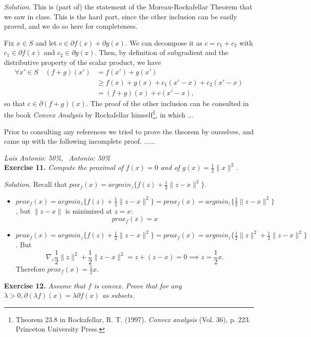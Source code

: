 \documentclass[12pt]{article}
\begin{document}
\emph{Solution}. This is (part of) the statement of the Moreau-Rockafellar Theorem that we saw in class. This is the hard part, since the other inclusion can be easily proved, and we do so here for completeness.\newpage

Fix $x\in S$ and let $c\in \partial f(x) + \partial g(x)$. We can decompose it as $c=c_1+c_2$ with $c_1\in\partial f(x)$ and $c_2\in \partial g(x)$. Then, by definition of subgradient and the distributive property of the scalar product, we have
\begin{align*}
\forall x' \in S \quad (f+g)(x') &= f(x') + g(x')\\
&\geq f(x) + g(x) + c_1(x'-x) + c_2(x'-x)\\
&= (f+g)(x) + c(x'-x),
\end{align*}
so that $c\in \partial(f+g)(x)$. The proof of the other inclusion can be consulted in the book \textit{Convex Analysis} by Rockafellar himself\footnote{Theorem 23.8 in Rockafellar, R. T. (1997). \textit{Convex analysis} (Vol. 36), p. 223. Princeton University Press.}, in which ...

Prior to consulting any references we tried to prove the theorem by ourselves, and came up with the following incomplete proof. ......

\textit{Luis Antonio: 50\%}, \ \textit{Antonio: 50\%}\\
\textbf{Exercise 11. }\emph{Compute the proximal of \( f(x) = 0 \) and of \( g(x) = \frac{1}{2}\|x\|^2 \).}

\emph{Solution. }Recall that \( pox_f(x) = argmin_z\{f(z) + \frac{1}{2} \|z - x\|^2 \} \).
\begin{itemize}
    \item \( prox_f(x) = argmin_z\{f(z) + \frac{1}{2} \|z - x\|^2 \}  =  prox_f(x) = argmin_z\{ \frac{1}{2} \|z - x\|^2 \} \), but \( \|z-x\| \) is minimized at \( z = x \):
    \[
         prox_f(x) = x
    \]
    \item  \( prox_f(x) = argmin_z\{f(z) + \frac{1}{2} \|z - x\|^2 \}  =  prox_f(x) = argmin_z\{\frac{1}{2}\|z\|^2 + \frac{1}{2} \|z - x\|^2 \} \). But
    \[
         \nabla_z \frac{1}{2} \|z\|^2 + \frac{1}{2}\|z-x\|^2 = z + (z - x) = 0 \implies z = \frac{1}{2}x.
    \]
    Therefore \( prox_f(x) = \frac{1}{2}x \).
\end{itemize}

\textbf{Exercise 12. }\emph{Assume that \( f \)  is convex. Prove that for any \( \lambda > 0, \partial(\lambda f)(x) = \lambda \partial f(x) \) as subsets.}
\end{document}
